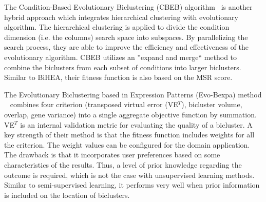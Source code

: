 
The Condition-Based Evolutionary Biclustering (CBEB) algorithm~\cite{huang2012parallelized} is another hybrid approach which integrates hierarchical clustering with evolutionary algorithm.
The hierarchical clustering is applied to divide the condition dimension (i.e. the columns) search space into subspaces.
By parallelizing the search process, they are able to improve the efficiency and effectiveness of the evolutionary algorithm.
CBEB utilizes an ''expand and merge`` method to combine the biclusters from each subset of conditions into larger biclusters.
Similar to BiHEA, their fitness function is also based on the MSR score.

The Evolutionary Biclustering based in Expression Patterns (Evo-Bexpa) method ~\cite{pontes2013configurable} combines four criterion (transposed virtual error (VE$^T$), bicluster volume, overlap, gene variance) into a single aggregate objective function by summation.
VE$^T$ is an internal validation metric for evaluating the quality of a bicluster.
A key strength of their method is that the fitness function includes weights for all the criterion.
The weight values can be configured for the domain application.
The drawback is that it incorporates user preferences based on some characteristics of the results. Thus, a level of prior knowledge regarding the outcome is required, which is not the case with unsupervised learning methods.
Similar to semi-supervised learning, it performs very well when prior information is included on the location of biclusters.

